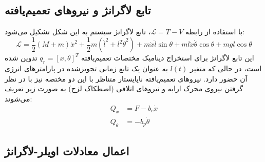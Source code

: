 \subsection{تابع لاگرانژ و نیروهای تعمیم‌یافته}

با استفاده از رابطه $\mathcal{L} = T - V$، تابع لاگرانژ سیستم به این شکل تشکیل می‌شود:
\begin{equation}
    \mathcal{L} = \frac{1}{2}(M+m)\dot{x}^2 + \frac{1}{2}m(\dot{l}^2 + l^2\dot{\theta}^2) + m\dot{x}\dot{l}\sin\theta + ml\dot{x}\dot{\theta}\cos\theta + mgl\cos\theta
\end{equation}
این تابع لاگرانژ برای استخراج دینامیک مختصات تعمیم‌یافته $q_r = [x, \theta]^T$ تدوین شده است، در حالی که متغیر $l(t)$ به عنوان یک تابع زمانی تجویزشده در پارامترهای انرژی آن حضور دارد. نیروهای تعمیم‌یافته ناپایستار متناظر با این دو مختصه نیز با در نظر گرفتن نیروی محرک ارابه و نیروهای اتلافی (اصطکاک لزج) به صورت زیر تعریف می‌شوند:
\begin{align}
    Q_x      & = F - b_c\dot{x}   \\
    Q_\theta & = -b_p\dot{\theta}
\end{align}

\subsection{اعمال معادلات اویلر-لاگرانژ}

